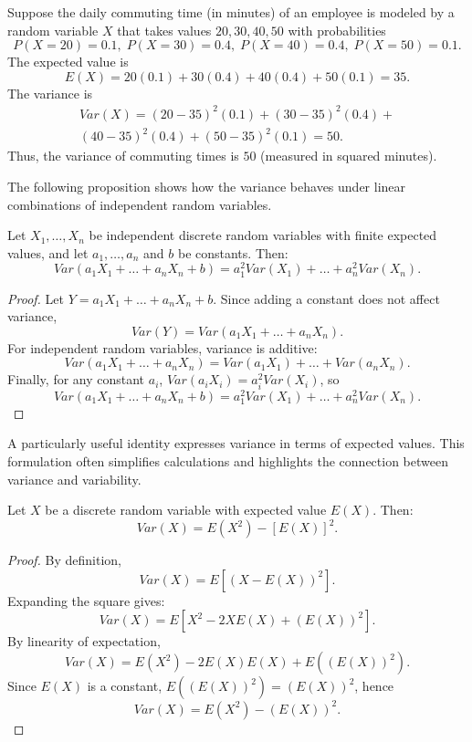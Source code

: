 \begin{example}\label{ex:daily_commuting_time}
Suppose the daily commuting time (in minutes) of an employee is modeled by a random variable $X$ that takes values ${20, 30, 40, 50}$ with probabilities
\[
P(X=20)=0.1,\; P(X=30)=0.4,\; P(X=40)=0.4,\; P(X=50)=0.1.
\]
The expected value is
\[
E(X) = 20(0.1) + 30(0.4) + 40(0.4) + 50(0.1) = 35.
\]
The variance is
\begin{equation*}
\begin{split}
Var(X) = (20-35)^2(0.1) + (30-35)^2(0.4) + \\ 
         (40-35)^2(0.4) + (50-35)^2(0.1) = 50.
\end{split}
\end{equation*}
Thus, the variance of commuting times is $50$ (measured in squared minutes).
\end{example}

The following proposition shows how the variance behaves under linear combinations of independent random variables.

\begin{proposition}
Let $X_{1}, \ldots, X_{n}$ be independent discrete random variables with finite expected values, and let $a_{1}, \ldots, a_{n}$ and $b$ be constants. Then:
\[
Var\left(a_{1}X_{1}+\ldots+a_{n}X_{n}+b\right) = a_{1}^{2}Var(X_{1}) + \ldots + a_{n}^{2}Var(X_{n}).
\]
\end{proposition}
\begin{proof}
Let $Y = a_{1}X_{1} + \ldots + a_{n}X_{n} + b$. Since adding a constant does not affect variance,
\[
Var(Y) = Var(a_{1}X_{1} + \ldots + a_{n}X_{n}).
\]
For independent random variables, variance is additive:
\[
Var(a_{1}X_{1} + \ldots + a_{n}X_{n}) = Var(a_{1}X_{1}) + \ldots + Var(a_{n}X_{n}).
\]
Finally, for any constant $a_i$, $Var(a_i X_i) = a_i^2 Var(X_i)$, so
\[
Var(a_{1}X_{1} + \ldots + a_{n}X_{n} + b) = a_{1}^{2}Var(X_{1}) + \ldots + a_{n}^{2}Var(X_{n}).
\]
\end{proof}

A particularly useful identity expresses variance in terms of expected values. This formulation often simplifies calculations and highlights the connection between variance and variability.

\begin{proposition}
Let $X$ be a discrete random variable with expected value $E(X)$. Then:
\[
Var(X) = E(X^2) - [E(X)]^2.
\]
\end{proposition}
\begin{proof}
By definition,
\[
Var(X) = E[(X - E(X))^2].
\]
Expanding the square gives:
\[
Var(X) = E[X^2 - 2X E(X) + (E(X))^2].
\]
By linearity of expectation,
\[
Var(X) = E(X^2) - 2E(X)E(X) + E((E(X))^2).
\]
Since $E(X)$ is a constant, $E((E(X))^2) = (E(X))^2$, hence
\[
Var(X) = E(X^2) - (E(X))^2.
\]
\end{proof}

